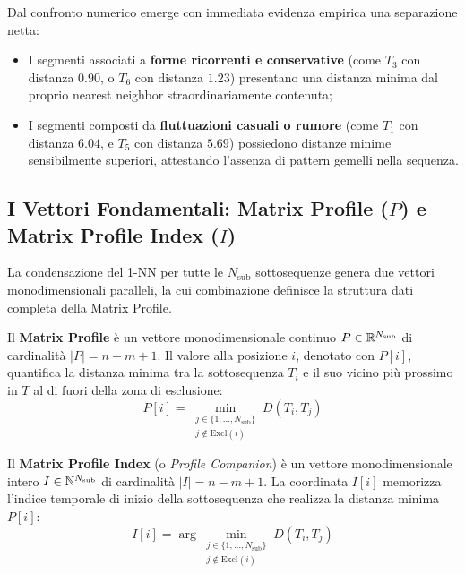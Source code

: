 Dal confronto numerico emerge con immediata evidenza empirica una separazione netta:
\begin{itemize}
    \item I segmenti associati a \textbf{forme ricorrenti e conservative} (come $T_3$ con distanza $0.90$, o $T_6$ con distanza $1.23$) presentano una distanza minima dal proprio nearest neighbor straordinariamente contenuta;
    \item I segmenti composti da \textbf{fluttuazioni casuali o rumore} (come $T_1$ con distanza $6.04$, e $T_5$ con distanza $5.69$) possiedono distanze minime sensibilmente superiori, attestando l'assenza di pattern gemelli nella sequenza.
\end{itemize}

\FloatBarrier
\subsection{I Vettori Fondamentali: Matrix Profile ($P$) e Matrix Profile Index ($I$)}
\label{subsec:ts-vectors-p-and-i}

La condensazione del 1-NN per tutte le $N_{\text{sub}}$ sottosequenze genera due vettori monodimensionali paralleli, la cui combinazione definisce la struttura dati completa della Matrix Profile.

\begin{definition}
\label{def:vector-p}
Il \textbf{Matrix Profile} \`e un vettore monodimensionale continuo $P \in \mathbb{R}^{N_{\text{sub}}}$ di cardinalit\`a $|P| = n - m + 1$. Il valore alla posizione $i$, denotato con $P[i]$, quantifica la distanza minima tra la sottosequenza $T_i$ e il suo vicino pi\`u prossimo in $T$ al di fuori della zona di esclusione:
\begin{equation}
\label{eq:matrix-profile-p}
P[i] = \min_{\substack{j \in \{1, \dots, N_{\text{sub}}\} \\ j \notin \text{Excl}(i)}} D(T_i, T_j)
\end{equation}
\end{definition}

\begin{definition}
\label{def:vector-i}
Il \textbf{Matrix Profile Index} (o \textit{Profile Companion}) \`e un vettore monodimensionale intero $I \in \mathbb{N}^{N_{\text{sub}}}$ di cardinalit\`a $|I| = n - m + 1$. La coordinata $I[i]$ memorizza l'indice temporale di inizio della sottosequenza che realizza la distanza minima $P[i]$:
\begin{equation}
\label{eq:matrix-profile-i}
I[i] = \arg\min_{\substack{j \in \{1, \dots, N_{\text{sub}}\} \\ j \notin \text{Excl}(i)}} D(T_i, T_j)
\end{equation}
\end{definition}

